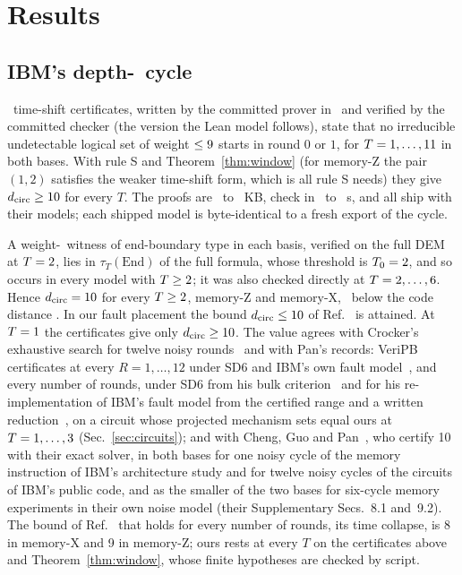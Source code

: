 \documentclass[aps,pra,twocolumn,superscriptaddress,nofootinbib,longbibliography,floatfix]{revtex4-2}
\newcommand{\dc}{d_{\mathrm{circ}}}
\begin{document}
\section{Results}
\label{sec:results}

\subsection{IBM's depth-\IbmDepth\ cycle}

\IbmRecertCerts\ time-shift certificates, written by the committed prover in \CdpFiveName\ and verified by the committed checker (the version the Lean model follows), state that no irreducible undetectable logical set of weight $\le9$ starts in round $0$ or $1$, for $T=1,\dots,11$ in both bases. With rule S and Theorem~\ref{thm:window} (for memory-Z the pair $(1,2)$ satisfies the weaker time-shift form, which is all rule S needs) they give $\dc\ge\IbmD$ for every $T$. The proofs are \IbmRecertKBLo\ to \IbmRecertKBHi~KB, check in \IbmRecertCheckSLo\ to \IbmRecertCheckSHi~s, and all ship with their models; each shipped model is byte-identical to a fresh export of the cycle.

A weight-\IbmD\ witness of end-boundary type in each basis, verified on the full DEM at $T=2$, lies in $\tau_T(\mathrm{End})$ of the full formula, whose threshold is $T_0=2$, and so occurs in every model with $T\ge2$; it was also checked directly at $T=2,\dots,6$. Hence $\dc=\IbmD$ for every $T\ge2$, memory-Z and memory-X, \IbmLoss\ below the code distance \GrossD. In our fault placement the bound $\dc\le\LitIbmUpper$ of Ref.~\cite{bravyi2024high} is attained. At $T=1$ the certificates give only $\dc\ge\IbmD$. The value agrees with Crocker's exhaustive search for twelve noisy rounds~\cite{crocker2026gross} and with Pan's records: VeriPB certificates at every $R=1,\dots,12$ under SD6 and IBM's own fault model~\cite{pan2026e037}, and every number of rounds, under SD6 from his bulk criterion~\cite{pan2026e043} and for his re-implementation of IBM's fault model from the certified range and a written reduction~\cite{pan2026e045}, on a circuit whose projected mechanism sets equal ours at $T=1,\dots,3$ (Sec.~\ref{sec:circuits}); and with Cheng, Guo and Pan~\cite{cheng2026certifying}, who certify 10 with their exact solver, in both bases for one noisy cycle of the memory instruction of IBM's architecture study and for twelve noisy cycles of the circuits of IBM's public code, and as the smaller of the two bases for six-cycle memory experiments in their own noise model (their Supplementary Secs.~8.1 and~9.2). The bound of Ref.~\cite{cheng2026certifying} that holds for every number of rounds, its time collapse, is 8 in memory-X and 9 in memory-Z; ours rests at every $T$ on the certificates above and Theorem~\ref{thm:window}, whose finite hypotheses are checked by script.
\end{document}
